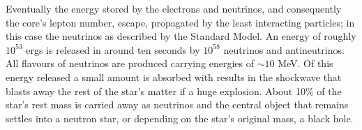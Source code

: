 Eventually the energy stored by the electrons and neutrinos, and consequently the core's lepton number, escape, propagated by the least interacting particles; in this case the neutrinos as described by the Standard Model.
An energy of roughly $10^{53}$ ergs is released in around ten seconds by $10^{58}$ neutrinos and antineutrinos.
All flavours of neutrinos are produced carrying energies of $\sim 10$ MeV.
Of this energy released a small amount is absorbed with results in the shockwave that blasts away the rest of the star's matter if a huge explosion. 
About 10\% of the star's rest mass is carried away as neutrinos and the central object that remains settles into a neutron star, or depending on the star's original mass, a black hole.























































